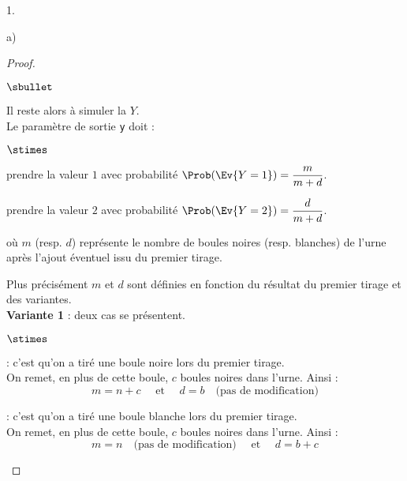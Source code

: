 \documentclass[11pt]{article}%
\begin{document}
\begin{noliste}{1.}
\begin{noliste}{a)}
\begin{proof}
\begin{noliste}{$\sbullet$}
      \item Il reste alors à simuler la \var $Y$.\\
        Le paramètre de sortie {\tt y} doit :
        \begin{noliste}{$\stimes$}
        \item prendre la valeur $1$ avec probabilité $\Prob(\Ev{Y =
            1}) = \dfrac{m}{m+d}$.
        \item prendre la valeur $2$ avec probabilité $\Prob(\Ev{Y =
            2}) = \dfrac{d}{m+d}$.
        \end{noliste}
        où $m$ (resp. $d$) représente le nombre de boules noires
        (resp. blanches) de l'urne après l'ajout éventuel issu du
        premier tirage.
      \item Plus précisément $m$ et $d$ sont définies en fonction du
        résultat du premier tirage et des variantes.\\
        {\bf Variante 1} : deux cas se présentent.
        \begin{noliste}{$\stimes$}
        \item {} : c'est qu'on a tiré une
          boule noire lors du premier tirage.\\
          On remet, en plus de cette boule, $c$ boules noires dans
          l'urne. Ainsi : 
          \[
          m = n + c \quad \text{ et } \quad d = b \quad \text{(pas de
            modification)}
          \]
        \item {} : c'est qu'on a
          tiré une boule blanche lors du premier tirage.\\
          On remet, en plus de cette boule, $c$ boules noires dans
          l'urne. Ainsi :
          \[
          m = n \quad \text{(pas de modification)} \quad \text{ et }
          \quad d = b + c
          \]          
        \end{noliste}





\end{noliste}
\end{proof}
\end{noliste}
\end{noliste}
\end{document}
